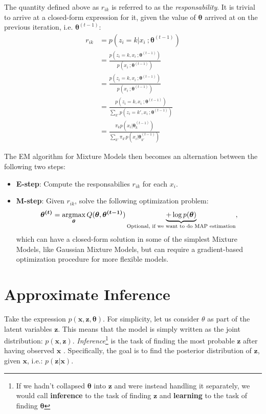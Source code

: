 The quantity defined above as $r_{ik}$ is referred to as the \emph{responsability}. It
is trivial to arrive at a closed-form expression for it, given the value of $\bm{\theta}$
arrived at on the previous iteration, i.e. $\bm{\theta}^{(t-1)}$:
\begin{align}
    r_{ik} &= p(z_i = k | x_i\ ; \bm{\theta}^{(t-1)}) \\
    &= \frac{p(z_i = k , x_i\ ; \bm{\theta}^{(t-1)})}{p(x_i\ ; \bm{\theta}^{(t-1)})} \\
    &= \frac{p(z_i = k , x_i\ ; \bm{\theta}^{(t-1)})}{p(x_i\ ; \bm{\theta}^{(t-1)})} \\
    &= \frac{p(z_i = k , x_i\ ; \bm{\theta}^{(t-1)})}{\sum_{k'} p(z_i = k' , x_i\ ; \bm{\theta}^{(t-1)})} \\
    &= \frac{\pi_k p(x_i | \bm{\theta}_k^{(t-1)})}{\sum_{k'} \pi_{k'} p(x_i | \bm{\theta}_{k'}^{(t-1)})}
\end{align}

The EM algorithm for Mixture Models then becomes an alternation between the
following two steps:
\begin{itemize}
    \item \textbf{E-step}: Compute the responsabilies $r_{ik}$ for each $x_i$.
    \item \textbf{M-step}: Given $r_{ik}$, solve the following optimization
        problem:
        \begin{align}
            \bm{\theta^{(t)}} = \argmax_{\bm{\theta}} Q(\bm{\theta}, \bm{\theta^{(t-1)}})
                \underbrace{+ \log p(\bm{\theta})}_\text{Optional, if we want to do MAP estimation},
        \end{align} which can have a closed-form solution in some of the simplest Mixture Models,
        like Gaussian Mixture Models, but can require a gradient-based optimization procedure for
        more flexible models.
\end{itemize}

\section{Approximate Inference}
\label{section:probmodelinf}
Take the expression $p(\bm{x}, \bm{z}, \bm{\theta})$. For simplicity, let us consider $\theta$
as part of the latent variables $\bm{z}$. This means that the model is simply written
as the joint distribution: $p(\bm{x}, \bm{z})$. \emph{Inference}\footnote{If we hadn't collapsed
$\bm{\theta}$ into $\bm{z}$ and were instead handling it separately, we would call
\textbf{inference} to the task of finding $\bm{z}$ and \textbf{learning} to the
task of finding $\bm{\theta}$} is the task of finding the most probable $\bm{z}$ after
having observed $\bm{x}$ . Specifically, the goal is to find the posterior distribution of $\bm{z}$,
given $\bm{x}$, i.e.: $p(\bm{z}|\bm{x})$.

